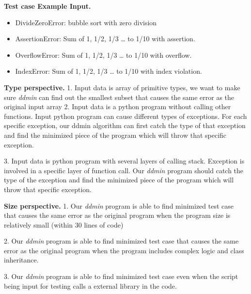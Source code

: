 \documentclass[12pt]{article}
\def\name{\textit{ddmin}\xspace}
\begin{document}
\noindent
\textbf{Test case Example Input.} 
\begin{itemize}
	\item DivideZeroError: bubble sort with zero division
	\item AssertionError: Sum of 1, 1/2, 1/3 … to 1/10 with assertion. 
	\item OverflowError: Sum of 1, 1/2, 1/3 … to 1/10 with overflow.
	\item IndexError: Sum of 1, 1/2, 1/3 … to 1/10 with index violation. 
\end{itemize}


\noindent
\textbf{Type perspective.}
1. Input data is array of primitive types, we want to make sure \name can find out the smallest subset that causes the same error as the original input array
2. Input data is a python program without calling other functions. Input python program can cause different types of exceptions. For each specific exception, our ddmin algorithm can first catch the type of that exception and find the minimized piece of the program which will throw that specific exception.

3. Input data is python program with several layers of calling stack. Exception is involved in a specific layer of function call. Our \name program should catch the type of the exception and find the minimized piece of the program which will throw that specific exception.

\noindent
\textbf{Size perspective.}
1. Our \name program is able to find minimized test case that causes the same error as the original program when the program size is relatively small (within 30 lines of code)

2. Our \name program is able to find minimized test case that causes the same error as the original program when the program includes complex logic and class inheritance. 


3. Our \name program is able to find minimized test case even when the script being input for testing calls a external library in the code. 






\end{document}
